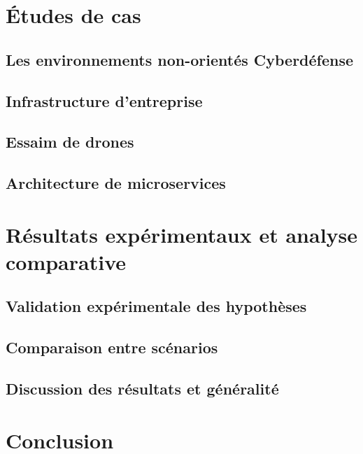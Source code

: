 \chapter{Études de cas}
\section{Les environnements non-orientés Cyberdéfense}
\section{Infrastructure d'entreprise}
\section{Essaim de drones}
\section{Architecture de microservices}

\chapter{Résultats expérimentaux et analyse comparative}
\section{Validation expérimentale des hypothèses}
\section{Comparaison entre scénarios}
\section{Discussion des résultats et généralité}

\chapter*{Conclusion}
